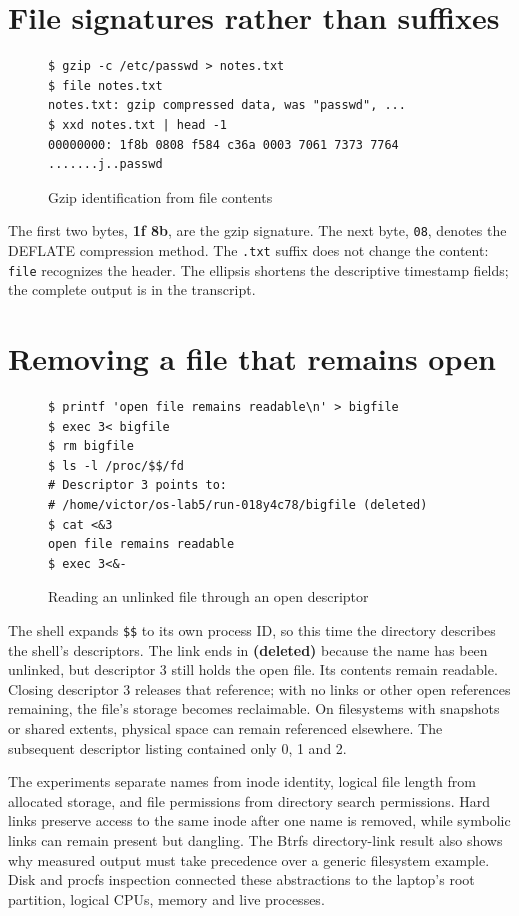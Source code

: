 \documentclass{../latex/utmreport}
\begin{document}
\section{File signatures rather than
suffixes}\label{file-signatures-rather-than-suffixes}

\begin{figure}[H]
\begin{lstlisting}
$ gzip -c /etc/passwd > notes.txt
$ file notes.txt
notes.txt: gzip compressed data, was "passwd", ...
$ xxd notes.txt | head -1
00000000: 1f8b 0808 f584 c36a 0003 7061 7373 7764  .......j..passwd
\end{lstlisting}
\caption{Gzip identification from file contents}
\end{figure}

The first two bytes, \textbf{1f 8b}, are the gzip signature. The next
byte, \texttt{08}, denotes the DEFLATE compression method. The
\texttt{.txt} suffix does not change the content: \texttt{file}
recognizes the header. The ellipsis shortens the descriptive timestamp
fields; the complete output is in the transcript.

\section{Removing a file that remains
open}\label{removing-a-file-that-remains-open}

\begin{figure}[H]
\begin{lstlisting}
$ printf 'open file remains readable\n' > bigfile
$ exec 3< bigfile
$ rm bigfile
$ ls -l /proc/$$/fd
# Descriptor 3 points to:
# /home/victor/os-lab5/run-018y4c78/bigfile (deleted)
$ cat <&3
open file remains readable
$ exec 3<&-
\end{lstlisting}
\caption{Reading an unlinked file through an open descriptor}
\end{figure}

The shell expands \texttt{\$\$} to its own process ID, so this time the
directory describes the shell's descriptors. The link ends in
\textbf{(deleted)} because the name has been unlinked, but descriptor 3
still holds the open file. Its contents remain readable. Closing
descriptor 3 releases that reference; with no links or other open
references remaining, the file's storage becomes reclaimable. On
filesystems with snapshots or shared extents, physical space can remain
referenced elsewhere. The subsequent descriptor listing contained only
0, 1 and 2.

\utmconclusions

The experiments separate names from inode identity, logical file length
from allocated storage, and file permissions from directory search
permissions. Hard links preserve access to the same inode after one name
is removed, while symbolic links can remain present but dangling. The
Btrfs directory-link result also shows why measured output must take
precedence over a generic filesystem example. Disk and procfs inspection
connected these abstractions to the laptop's root partition, logical
CPUs, memory and live processes.
\end{document}
